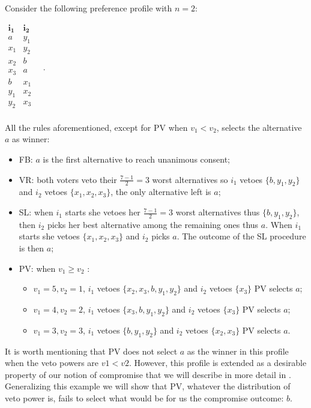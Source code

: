 \begin{example}
	\label{ex:CompromiseEQ2}
	Consider the following preference profile with $n=2$:
	\begin{center}
		$
		\begin{array}{cc}
			\mathbf{i_1} & \mathbf{i_2} \\
			a	&	y_1	\\
			x_1	&	y_2	\\
			x_2	&	b \\
			x_3	&	a \\
			b	&	x_1	\\
			y_1	&	x_2	\\
			y_2	&	x_3	\\
		\end{array} \quad.
		$
	\end{center}
	All the rules aforementioned, except for \acs{PV} when $v_1 < v_2$, selects the alternative $a$ as winner:
	\begin{itemize}
		\itemsep0em
		\item[] \acs{FB}: $a$ is the first alternative to reach unanimous consent;
		\item[] \acs{VR}: both voters veto their $\frac{7-1}{2}=3$ worst alternatives so $i_1$ vetoes $\{b,y_1,y_2\}$ and $i_2$ vetoes $\{x_1,x_2,x_3\}$, the only alternative left is $a$;
		\item[] \acs{SL}: when $i_1$ starts she vetoes her $\frac{7-1}{2}=3$ worst alternatives thus $\{b,y_1,y_2\}$, then $i_2$ picks her best alternative among the remaining ones thus $a$. When $i_1$ starts she vetoes $\{x_1,x_2,x_3\}$ and $i_2$ picks $a$. The outcome of the \acs{SL} procedure is then $a$;
		\item[] \acs{PV}: when $v_1\geq v_2$ :
		\begin{itemize}
			\item $v_1=5, v_2=1$, $i_1$ vetoes $\{x_2,x_3,b,y_1,y_2\}$ and $i_2$ vetoes $\{x_3\}$ \acs{PV} selects $a$;
			\item $v_1=4, v_2=2$, $i_1$ vetoes $\{x_3,b,y_1,y_2\}$ and $i_2$ vetoes $\{x_3\}$ \acs{PV} selects $a$;
			\item $v_1=3, v_2=3$, $i_1$ vetoes $\{b,y_1,y_2\}$ and $i_2$ vetoes $\{x_2,x_3\}$ \acs{PV} selects $a$.
		\end{itemize}
	\end{itemize}	
\end{example}
It is worth mentioning that \acs{PV} does not select $a$ as the winner in this profile when the veto powers are $v1<v2$. However, this profile is extended as a desirable property of our notion of compromise that we will describe in more detail in . Generalizing this example we will show that \acs{PV}, whatever the distribution of veto power is, fails to select what would be for us the compromise outcome: $b$.


